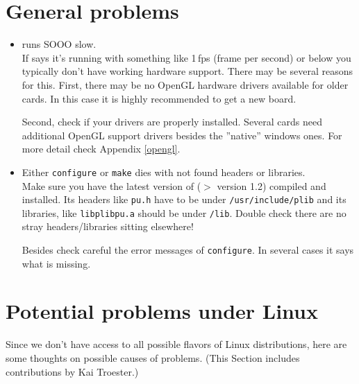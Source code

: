 \section{General problems}
\begin{itemize}

\item{\FlightGear{} runs SOOO slow.}\\
 If \FlightGear{} says it's running with something like 1\,fps
 (frame per second) or below you typically don't have working hardware
  support. There may be several reasons for this. First,
 there may be no OpenGL hardware drivers available for older
 cards. In this case it is highly recommended to get a new board.

 Second, check if your drivers are properly installed. Several
 cards need additional OpenGL support drivers besides the
 ''native'' windows ones. For more detail check Appendix
 \ref{opengl}.

\item{Either \texttt{configure} or \texttt{make} dies with not found \PLIB{} headers or
 libraries.}\\
  Make sure you have the latest version of \PLIB{} ($>$ version 1.2) compiled and installed.
  Its headers like \texttt{pu.h} have to be under \texttt{/usr/include/plib} and its libraries, like \texttt{libplibpu.a} should be under \texttt{/lib}. Double check there are no stray \PLIB{} headers/libraries sitting elsewhere!

  Besides check careful the error messages of \texttt{configure}. In several cases it
  says what is missing.
 \end{itemize}

\section{Potential problems under Linux}
Since we don't have access to all possible flavors of Linux distributions, here are some
thoughts on possible causes of problems. (This Section includes contributions by Kai
Troester.)

